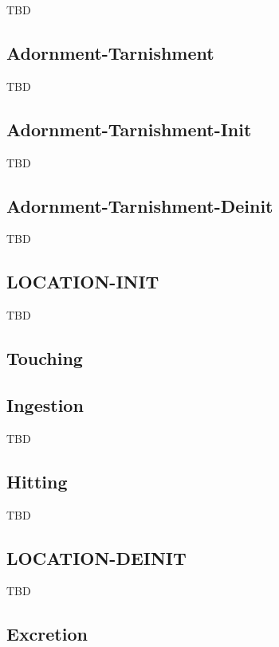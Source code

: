 \documentclass[a4paper]{article}
\newcommand{\fr}[1]{\textsf{#1}}
\begin{document}
TBD

\subsection{\fr{Adornment-Tarnishment}}
\label{sec:Adornment-Tarnishment}

TBD

\subsection{\fr{Adornment-Tarnishment-Init}}
\label{sec:Adornment-Tarnishment-Init}

TBD

\subsection{\fr{Adornment-Tarnishment-Deinit}}
\label{sec:Adornment-Tarnishment-Deinit}

TBD

\subsection{\fr{LOCATION-INIT}}
\label{sec:LOCATION-INIT}

TBD

\subsection{\fr{Touching}}
\label{sec:Touching}

\subsection{\fr{Ingestion}}
\label{sec:Ingestion}

TBD

\subsection{\fr{Hitting}}
\label{sec:Hitting}

TBD

\subsection{\fr{LOCATION-DEINIT}}
\label{sec:LOCATION-DEINIT}

TBD

\subsection{\fr{Excretion}}
\label{sec:Excretion}
\end{document}
